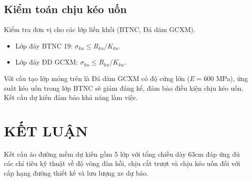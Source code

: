 \subsection{Kiểm toán chịu kéo uốn}
Kiểm tra đơn vị cho các lớp liền khối (BTNC, Đá dăm GCXM).
\begin{itemize}
    \item Lớp đáy BTNC 19: $\sigma_{ku} \le R_{ku} / K_{ku}$.
    \item Lớp đáy ĐD GCXM: $\sigma_{ku} \le R_{ku} / K_{ku}$.
\end{itemize}

Với cấu tạo lớp móng trên là Đá dăm GCXM có độ cứng lớn ($E=600$ MPa), ứng suất kéo uốn trong lớp BTNC sẽ giảm đáng kể, đảm bảo điều kiện chịu kéo uốn.
Kết cấu dự kiến đảm bảo khả năng làm việc.

\section{KẾT LUẬN}
Kết cấu áo đường mềm dự kiến gồm 5 lớp với tổng chiều dày 63cm đáp ứng đủ các chỉ tiêu kỹ thuật về độ võng đàn hồi, chịu cắt trượt và chịu kéo uốn đối với cấp hạng đường thiết kế và lưu lượng xe dự báo.

